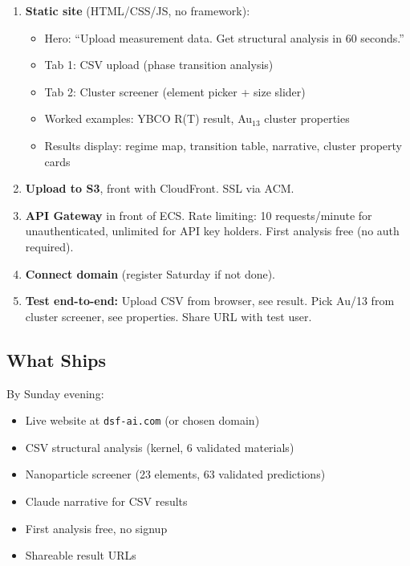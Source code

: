 \documentclass[11pt,letterpaper]{article}
\begin{document}
\begin{enumerate}
  \item \textbf{Static site} (HTML/CSS/JS, no framework):
    \begin{itemize}
      \item Hero: ``Upload measurement data. Get structural analysis
        in 60 seconds.''
      \item Tab 1: CSV upload (phase transition analysis)
      \item Tab 2: Cluster screener (element picker + size slider)
      \item Worked examples: YBCO R(T) result, Au$_{13}$ cluster
        properties
      \item Results display: regime map, transition table, narrative,
        cluster property cards
    \end{itemize}

  \item \textbf{Upload to S3}, front with CloudFront. SSL via ACM.

  \item \textbf{API Gateway} in front of ECS. Rate limiting: 10
    requests/minute for unauthenticated, unlimited for API key
    holders. First analysis free (no auth required).

  \item \textbf{Connect domain} (register Saturday if not done).

  \item \textbf{Test end-to-end:} Upload CSV from browser, see
    result. Pick Au/13 from cluster screener, see properties.
    Share URL with test user.
\end{enumerate}

\subsection{What Ships}

By Sunday evening:
\begin{itemize}
  \item Live website at \texttt{dsf-ai.com} (or chosen domain)
  \item CSV structural analysis (kernel, 6 validated materials)
  \item Nanoparticle screener (23 elements, 63 validated predictions)
  \item Claude narrative for CSV results
  \item First analysis free, no signup
  \item Shareable result URLs
\end{itemize}
\end{document}

